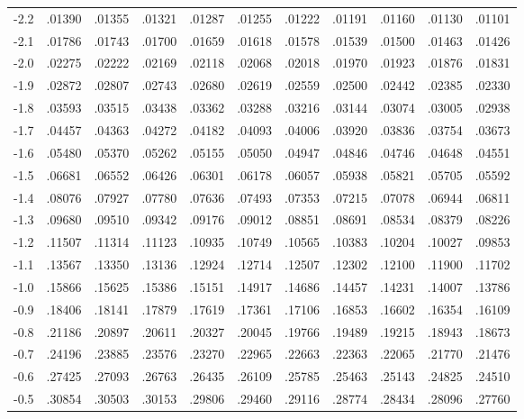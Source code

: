 \documentclass[]{article}
\begin{document}
\begin{center}
\begin{tabular}{l|llllllllll}
        -2.2 & .01390 & .01355 & .01321 & .01287 & .01255 & .01222 & .01191 & .01160 & .01130 & .01101 \\
        -2.1 & .01786 & .01743 & .01700 & .01659 & .01618 & .01578 & .01539 & .01500 & .01463 & .01426 \\
        -2.0 & .02275 & .02222 & .02169 & .02118 & .02068 & .02018 & .01970 & .01923 & .01876 & .01831 \\
        -1.9 & .02872 & .02807 & .02743 & .02680 & .02619 & .02559 & .02500 & .02442 & .02385 & .02330 \\
        -1.8 & .03593 & .03515 & .03438 & .03362 & .03288 & .03216 & .03144 & .03074 & .03005 & .02938 \\
        -1.7 & .04457 & .04363 & .04272 & .04182 & .04093 & .04006 & .03920 & .03836 & .03754 & .03673 \\
        -1.6 & .05480 & .05370 & .05262 & .05155 & .05050 & .04947 & .04846 & .04746 & .04648 & .04551 \\
        -1.5 & .06681 & .06552 & .06426 & .06301 & .06178 & .06057 & .05938 & .05821 & .05705 & .05592 \\
        -1.4 & .08076 & .07927 & .07780 & .07636 & .07493 & .07353 & .07215 & .07078 & .06944 & .06811 \\
        -1.3 & .09680 & .09510 & .09342 & .09176 & .09012 & .08851 & .08691 & .08534 & .08379 & .08226 \\
        -1.2 & .11507 & .11314 & .11123 & .10935 & .10749 & .10565 & .10383 & .10204 & .10027 & .09853 \\
        -1.1 & .13567 & .13350 & .13136 & .12924 & .12714 & .12507 & .12302 & .12100 & .11900 & .11702 \\
        -1.0 & .15866 & .15625 & .15386 & .15151 & .14917 & .14686 & .14457 & .14231 & .14007 & .13786 \\
        -0.9 & .18406 & .18141 & .17879 & .17619 & .17361 & .17106 & .16853 & .16602 & .16354 & .16109 \\
        -0.8 & .21186 & .20897 & .20611 & .20327 & .20045 & .19766 & .19489 & .19215 & .18943 & .18673 \\
        -0.7 & .24196 & .23885 & .23576 & .23270 & .22965 & .22663 & .22363 & .22065 & .21770 & .21476 \\
        -0.6 & .27425 & .27093 & .26763 & .26435 & .26109 & .25785 & .25463 & .25143 & .24825 & .24510 \\
        -0.5 & .30854 & .30503 & .30153 & .29806 & .29460 & .29116 & .28774 & .28434 & .28096 & .27760 \\

\end{tabular}
\end{center}
\end{document}
